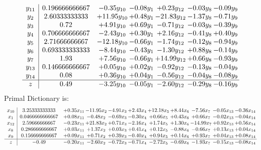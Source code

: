 \documentclass[9pt]{article}
\begin{document}
\[\begin{array}{c| c c@{\hskip 2pt} c@{\hskip 2pt} c@{\hskip 2pt} c@{\hskip 2pt} c@{\hskip 2pt} }
 y_{11}   &  0.196666666667 & -0.35 y_{10} & -0.08 y_{1} & +  0.23 y_{12} & -0.03 y_{8} & -0.09 y_{9}\\
 y_{2}   &  2.60333333333 & + 11.95 y_{10} & +  0.48 y_{1} & -21.83 y_{12} & -1.37 y_{8} & -0.71 y_{9}\\
 y_{3}   &  0.72 & +  4.91 y_{10} & +  0.69 y_{1} & -0.71 y_{12} & -0.03 y_{8} & -0.39 y_{9}\\
 y_{4}   &  0.706666666667 & -2.43 y_{10} & +  0.30 y_{1} & +  2.16 y_{12} & -0.41 y_{8} & +  0.40 y_{9}\\
 y_{5}   &  2.71666666667 & -12.18 y_{10} & -0.66 y_{1} & -1.74 y_{12} & -0.12 y_{8} & -0.94 y_{9}\\
 y_{6}   &  0.693333333333 & -8.44 y_{10} & -0.43 y_{1} & -1.30 y_{12} & +  0.88 y_{8} & -0.14 y_{9}\\
 y_{7}   &  1.93 & +  7.56 y_{10} & -0.66 y_{1} & + 14.99 y_{12} & +  0.66 y_{8} & -0.93 y_{9}\\
 y_{13}   &  0.146666666667 & +  0.05 y_{10} & +  0.02 y_{1} & -0.92 y_{12} & -0.13 y_{8} & -0.04 y_{9}\\
 y_{14}   &  0.08 & +  0.36 y_{10} & +  0.04 y_{1} & -0.56 y_{12} & -0.04 y_{8} & -0.08 y_{9}\\
\hline
z    &  0.49 & -3.25 y_{10} & -0.05 y_{1} & -2.60 y_{12} & -0.29 y_{8} & -0.16 y_{9}\\
\end{array}\]
Primal Dictionary is:
\[\begin{array}{c| c c@{\hskip 2pt} c@{\hskip 2pt} c@{\hskip 2pt} c@{\hskip 2pt} c@{\hskip 2pt} c@{\hskip 2pt} c@{\hskip 2pt} c@{\hskip 2pt} c@{\hskip 2pt} }
 x_{10}   &  3.25333333333 & +  0.35 x_{11} & -11.95 x_{2} & -4.91 x_{3} & +  2.43 x_{4} & + 12.18 x_{5} & +  8.44 x_{6} & -7.56 x_{7} & -0.05 x_{13} & -0.36 x_{14}\\
 x_{1}   &  0.0466666666667 & +  0.08 x_{11} & -0.48 x_{2} & -0.69 x_{3} & -0.30 x_{4} & +  0.66 x_{5} & +  0.43 x_{6} & +  0.66 x_{7} & -0.02 x_{13} & -0.04 x_{14}\\
 x_{12}   &  2.59666666667 & -0.23 x_{11} & + 21.83 x_{2} & +  0.71 x_{3} & -2.16 x_{4} & +  1.74 x_{5} & +  1.30 x_{6} & -14.99 x_{7} & +  0.92 x_{13} & +  0.56 x_{14}\\
 x_{8}   &  0.286666666667 & +  0.03 x_{11} & +  1.37 x_{2} & +  0.03 x_{3} & +  0.41 x_{4} & +  0.12 x_{5} & -0.88 x_{6} & -0.66 x_{7} & +  0.13 x_{13} & +  0.04 x_{14}\\
 x_{9}   &  0.156666666667 & +  0.09 x_{11} & +  0.71 x_{2} & +  0.39 x_{3} & -0.40 x_{4} & +  0.94 x_{5} & +  0.14 x_{6} & +  0.93 x_{7} & +  0.04 x_{13} & +  0.08 x_{14}\\
\hline
z    &  -0.49 & -0.20 x_{11} & -2.60 x_{2} & -0.72 x_{3} & -0.71 x_{4} & -2.72 x_{5} & -0.69 x_{6} & -1.93 x_{7} & -0.15 x_{13} & -0.08 x_{14}\\
\end{array}\]
\end{document}

